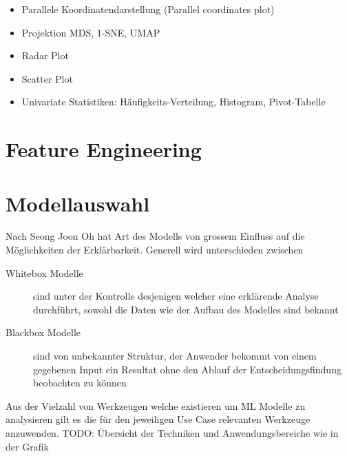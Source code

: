 \documentclass[
  12pt, %
  a4paper, %
  oneside, %
  openany, 
  numbers=noenddot, %
  BCOR=5mm, %
  parskip=half*, %
  thesis, %
]{bfhbook}
\begin{document}
\begin{itemize}
\begin{minipage}[t]{0.45\linewidth}
	\end{minipage}
	
	\item Parallele Koordinatendarstellung (Parallel coordinates plot)
	\item Projektion MDS, 1-SNE, UMAP
	\item Radar Plot
	\item Scatter Plot
	\item Univariate Statistiken: Häufigkeits-Verteilung, Histogram, Pivot-Tabelle
\end{itemize}
\section{Feature Engineering}

\section{Modellauswahl}
Nach Seong Joon Oh \parencite{Oh2019} hat Art des Modells von grossem Einfluss auf die Möglichkeiten der Erklärbarkeit. Generell wird unterschieden zwischen
\begin{description}
\item[Whitebox Modelle] sind unter der Kontrolle desjenigen welcher eine erklärende Analyse durchführt, sowohl die Daten wie der Aufbau des Modelles sind bekannt
\item[Blackbox Modelle] sind von unbekannter Struktur, der Anwender bekommt von einem gegebenen Input ein Resultat ohne den Ablauf der Entscheidungsfindung beobachten zu können
\end{description}

Aus der Vielzahl von Werkzeugen welche existieren um \acrfull{ML} Modelle zu analysieren gilt es die für den jeweiligen Use Case relevanten Werkzeuge anzuwenden.
TODO: Übersicht der Techniken und Anwendungsbereiche wie in der Grafik
\end{document}
